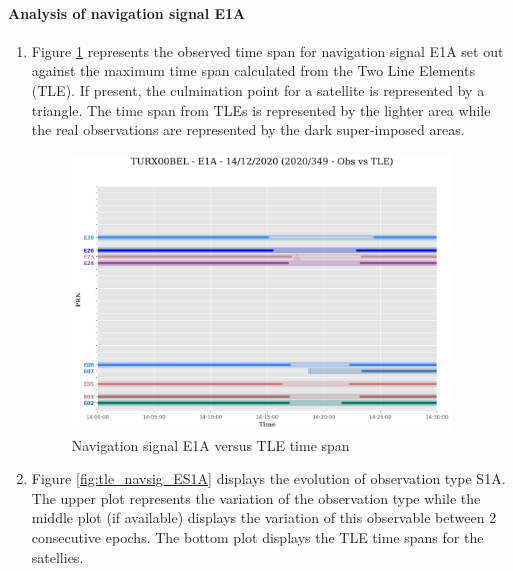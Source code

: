 \paragraph{Analysis of navigation signal E1A}%
\label{para:AnalysisofnavigationsignalE1A}%
\newpage%
\begin{enumerate}%
\item%
Figure \ref{fig:tle_navsig_1AE} represents the observed time span for navigation signal E1A set out against the maximum time span calculated from the  Two Line Elements (TLE). If present, the culmination point for a satellite is represented by a triangle. The time span from TLEs is represented by the lighter area while the real observations are represented by the dark super-imposed areas.%


\begin{figure}[H]%
\centering%
\includegraphics[width=0.95\textwidth]{png/TURX00BEL_R_20203491400_30M_01S_MO_E-E1A-TLE-arcs.png}%
\caption{\label{fig:tle_navsig_1AE} Navigation signal E1A versus TLE time span}%
\end{figure}

%
\item%
Figure \ref{fig:tle_navsig_ES1A} displays the evolution of observation type S1A. \newline The upper plot represents the variation of the observation type while the middle plot (if available) displays the variation of this observable between 2 consecutive epochs. The bottom plot displays the TLE time spans for the satellies.%



\end{enumerate}
